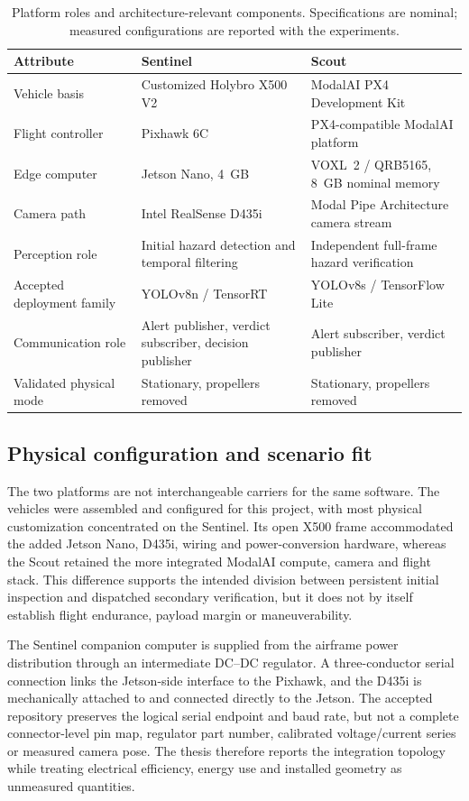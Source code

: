 \begin{table}[H]
  \centering
  \caption{Platform roles and architecture-relevant components. Specifications
  are nominal; measured configurations are reported with the experiments.}
  \label{tab:platforms}
  \small
  \begin{tabularx}{\textwidth}{@{}p{}XX@{}}
    \toprule
    Attribute & Sentinel & Scout \\
    \midrule
    Vehicle basis & Customized Holybro X500 V2 & ModalAI PX4 Development Kit \\
    Flight controller & Pixhawk 6C & PX4-compatible ModalAI platform \\
    Edge computer & Jetson Nano, 4~GB & VOXL~2 / QRB5165, 8~GB nominal memory \\
    Camera path & Intel RealSense D435i & Modal Pipe Architecture camera stream \\
    Perception role & Initial hazard detection and temporal filtering &
    Independent full-frame hazard verification \\
    Accepted deployment family & YOLOv8n / TensorRT & YOLOv8s / TensorFlow Lite \\
    Communication role & Alert publisher, verdict subscriber, decision
    publisher & Alert subscriber, verdict publisher \\
    Validated physical mode & Stationary, propellers removed & Stationary,
    propellers removed \\
    \bottomrule
  \end{tabularx}
\end{table}

\subsection{Physical configuration and scenario fit}

The two platforms are not interchangeable carriers for the same software. The
vehicles were assembled and configured for this project, with most physical
customization concentrated on the Sentinel. Its open X500 frame accommodated
the added Jetson Nano, D435i, wiring and power-conversion hardware, whereas the
Scout retained the more integrated ModalAI compute, camera and flight stack.
This difference supports the intended division between persistent initial
inspection and dispatched secondary verification, but it does not by itself
establish flight endurance, payload margin or maneuverability.

The Sentinel companion computer is supplied from the airframe power
distribution through an intermediate DC--DC regulator. A three-conductor
serial connection links the Jetson-side interface to the Pixhawk, and the
D435i is mechanically attached to and connected directly to the Jetson. The
accepted repository preserves the logical serial endpoint and baud rate, but
not a complete connector-level pin map, regulator part number, calibrated
voltage/current series or measured camera pose. The thesis therefore reports
the integration topology while treating electrical efficiency, energy use and
installed geometry as unmeasured quantities.

